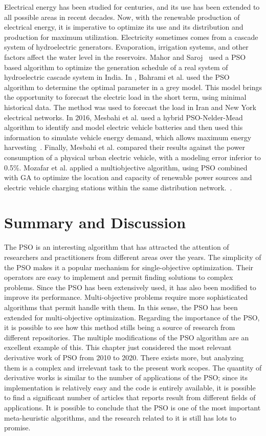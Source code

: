 Electrical energy has been studied for centuries, and its use has been extended to all possible areas in recent decades. Now, with the renewable production of electrical energy, it is imperative to optimize its use and its distribution and production for maximum utilization.
Electricity sometimes comes from a cascade system of hydroelectric generators. Evaporation, irrigation systems, and other factors affect the water level in the reservoirs. Mahor and Saroj~\cite{mahor2012short} used a PSO based algorithm to optimize the generation schedule of a real system of hydroelectric cascade system in India.
In \cite{bahrami2014short}, Bahrami et al. used the PSO algorithm to determine the optimal parameter in a grey model. This model brings the opportunity to forecast the electric load in the short term, using minimal historical data. The method was used to forecast the load in Iran and New York electrical networks.
In 2016, Mesbahi et al. used a hybrid PSO-Nelder-Mead algorithm to identify and model electric vehicle batteries and then used this information to simulate vehicle energy demand, which allows maximum energy harvesting~\cite{mesbahi2016dynamical}. Finally, Mesbahi et al. compared their results against the power consumption of a physical urban electric vehicle, with a modeling error inferior to 0.5\%.
Mozafar et al. applied a multiobjective algorithm, using PSO combined with GA to optimize the location and capacity of renewable power sources and electric vehicle charging stations within the same distribution network.~\cite{mozafar2017simultaneous}.

\section{Summary and Discussion}
\label{sec:pso-conclusions}

The PSO is an interesting algorithm that has attracted the attention of researchers and practitioners from different areas over the years. The simplicity of the PSO makes it a popular mechanism for single-objective optimization. Their operators are easy to implement and permit finding solutions to complex problems. Since the PSO has been extensively used, it has also been modified to improve its performance.
Multi-objective problems require more sophisticated algorithms that permit handle with them.
In this sense, the PSO has been extended for multi-objective optimization. Regarding the importance of the PSO, it is possible to see how this method stills being a source of research from different repositories. The multiple modifications of the PSO algorithm are an excellent example of this. This chapter just considered the most relevant derivative work of PSO from 2010 to 2020. There exists more, but analyzing them is a complex and irrelevant task to the present work scopes. The quantity of derivative works is similar to the number of applications of the PSO; since its implementation is relatively easy and the code is entirely available, it is possible to find a significant number of articles that reports result from different fields of applications. It is possible to conclude that the PSO is one of the most important meta-heuristic algorithms, and the research related to it is still has lots to promise.

